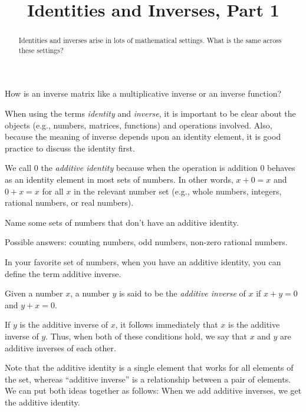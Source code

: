\documentclass{ximera}
\title{Identities and Inverses, Part 1}
\begin{document}
\begin{abstract}
Identities and inverses arise in lots of mathematical
settings.  What is the same across these settings?  
\end{abstract}
\maketitle


How is an inverse matrix like a multiplicative inverse or an inverse function?  

When using the terms \emph{identity} and \emph{inverse}, it is
important to be clear about the objects (e.g., numbers, matrices,
functions) and operations involved.  Also, because the meaning of
inverse depends upon an identity element, it is good practice to
discuss the identity first.

\begin{definition}
We call $0$ the \emph{additive identity} because when the operation is addition 
$0$ behaves as an identity element in most sets of numbers.  
In other words, $x+0=x$ and $0+x=x$ for all $x$ in the relevant number
set (e.g., whole numbers, integers, rational numbers, or real
numbers).
\end{definition}

\begin{question}
Name some sets of numbers that don't have an additive identity.
\begin{freeResponse}
Possible answers: counting numbers, odd numbers, non-zero rational
numbers.
\end{freeResponse}
\end{question}

In your favorite set of numbers, when you have an additive identity,
you can define the term additive inverse.  

\begin{definition}
Given a number $x$, a number $y$ is said to be the \emph{additive
  inverse} of $x$ if $x+y=0$ and $y+x=0$.  
\end{definition}

If $y$ is the additive inverse of $x$, it follows immediately that
$x$ is the additive inverse of $y$.  Thus, when both of these
conditions hold, we say that $x$ and $y$ are additive inverses of each
other.

Note that the additive identity is a single element that works for
all elements of the set, whereas ``additive inverse'' is a
relationship between a pair of elements.  We can put both ideas
together as follows: When we add additive inverses, we get the
additive identity.
\end{document}

